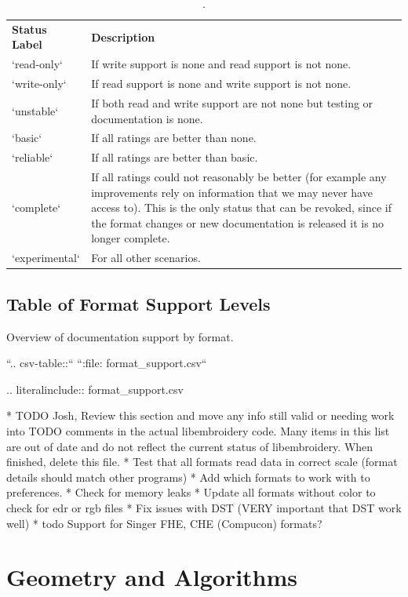\documentclass[a4paper]{report}
\begin{document}
\begin{table}
\begin{tabular}{l l}
\textbf{Status Label} &
\textbf{Description}
\\
`read-only` &
If write support is none and read support is not none.
\\
`write-only` &
If read support is none and write support is not none.
\\
`unstable` &
If both read and write support are not none but testing or documentation is none.
\\
`basic` &
If all ratings are better than none.
\\
`reliable` &
If all ratings are better than basic.
\\
`complete` &
If all ratings could not reasonably be better (for example any improvements
rely on information that we may never have access to). This is the only status
that can be revoked, since if the format changes or new documentation is
released it is no longer complete.
\\
`experimental` &
For all other scenarios.
\end{tabular}
\caption{.}
\end{table}

\subsection{Table of Format Support Levels}

Overview of documentation support by format.

``.. csv-table::``
``:file: format\_support.csv``

.. literalinclude:: format\_support.csv

* TODO Josh, Review this section and move any info still valid or needing work into TODO comments in the actual libembroidery code. Many items in this list are out of date and do not reflect the current status of libembroidery. When finished, delete this file.
  * Test that all formats read data in correct scale (format details should match other programs)
  * Add which formats to work with to preferences.
  * Check for memory leaks
  * Update all formats without color to check for edr or rgb files
  * Fix issues with DST (VERY important that DST work well)
* todo Support for Singer FHE, CHE (Compucon) formats?

\section{Geometry and Algorithms}
\end{document}
